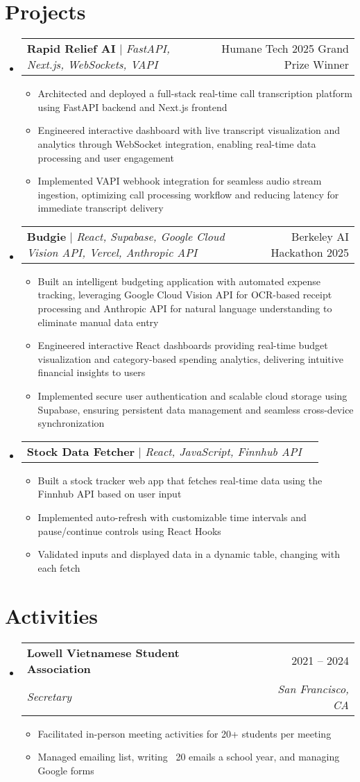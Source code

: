 \documentclass[letterpaper,11pt]{article}
\makeatletter
\newcommand{\resumeItem}[1]{
  \item\small{
    {#1 \vspace{-2pt}}
  }
}
\newcommand{\resumeSubheading}[4]{
  \vspace{-2pt}\item
    \begin{tabular*}{0.97\textwidth}[t]{l@{\extracolsep{\fill}}r}
      \textbf{#1} & #2 \\
      \textit{\small#3} & \textit{\small #4} \\
    \end{tabular*}\vspace{-7pt}
}
\newcommand{\resumeProjectHeading}[2]{
    \item
    \begin{tabular*}{0.97\textwidth}{l@{\extracolsep{\fill}}r}
      \small#1 & #2 \\
    \end{tabular*}\vspace{-7pt}
}
\newcommand{\resumeSubHeadingListStart}{\begin{itemize}[leftmargin=0.15in, label={}]}
\newcommand{\resumeSubHeadingListEnd}{\end{itemize}}
\newcommand{\resumeItemListStart}{\begin{itemize}}
\newcommand{\resumeItemListEnd}{\end{itemize}\vspace{-5pt}}
\makeatother
\begin{document}
\section{Projects}
    \resumeSubHeadingListStart
      \resumeProjectHeading
          {\textbf{Rapid Relief AI} $|$ \emph{FastAPI, Next.js, WebSockets, VAPI}}{Humane Tech 2025 Grand Prize Winner}
          \resumeItemListStart
            \resumeItem{Architected and deployed a full-stack real-time call transcription platform using FastAPI backend and Next.js frontend}
            \resumeItem{Engineered interactive dashboard with live transcript visualization and analytics through WebSocket integration, enabling real-time data processing and user engagement}
            \resumeItem{Implemented VAPI webhook integration for seamless audio stream ingestion, optimizing call processing workflow and reducing latency for immediate transcript delivery}
          \resumeItemListEnd
      \resumeProjectHeading
          {\textbf{Budgie} $|$ \emph{React, Supabase, Google Cloud Vision API, Vercel, Anthropic API}}{Berkeley AI Hackathon 2025}
          \resumeItemListStart
            \resumeItem{Built an intelligent budgeting application with automated expense tracking, leveraging Google Cloud Vision API for OCR-based receipt processing and Anthropic API for natural language understanding to eliminate manual data entry}
            \resumeItem{Engineered interactive React dashboards providing real-time budget visualization and category-based spending analytics, delivering intuitive financial insights to users}
            \resumeItem{Implemented secure user authentication and scalable cloud storage using Supabase, ensuring persistent data management and seamless cross-device synchronization}
          \resumeItemListEnd
      \resumeProjectHeading
          {\textbf{Stock Data Fetcher} $|$ \emph{React, JavaScript, Finnhub API}}{}
          \resumeItemListStart
            \resumeItem{Built a stock tracker web app that fetches real-time data using the Finnhub API based on user input}
            \resumeItem{Implemented auto-refresh with customizable time intervals and pause/continue controls using React Hooks}
            \resumeItem{Validated inputs and displayed data in a dynamic table, changing with each fetch}
          \resumeItemListEnd
    \resumeSubHeadingListEnd


\section{Activities}
  \resumeSubHeadingListStart
    \resumeSubheading
      {Lowell Vietnamese Student Association}{2021 -- 2024}
      {Secretary}{San Francisco, CA}
      \resumeItemListStart
        \resumeItem{Facilitated in-person meeting activities for 20+ students per meeting}
        \resumeItem{Managed emailing list, writing ~20 emails a school year, and managing Google forms}
      \resumeItemListEnd
  \resumeSubHeadingListEnd
\end{document}
